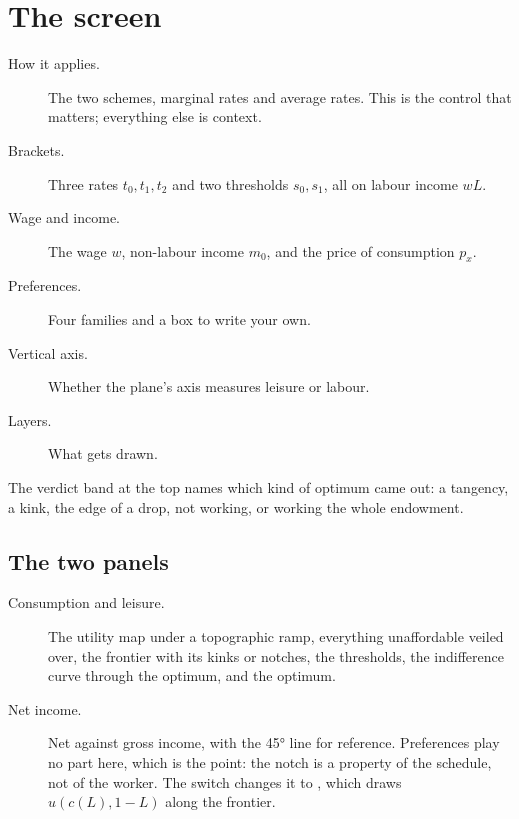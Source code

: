 \documentclass[11pt,a4paper]{appletmanual}
\begin{document}


\section{The screen}


\begin{description}
\item[How it applies.] The two schemes, marginal rates and average rates. This
  is the control that matters; everything else is context.
\item[Brackets.] Three rates $t_0, t_1, t_2$ and two thresholds $s_0, s_1$, all
  on labour income $wL$.
\item[Wage and income.] The wage $w$, non-labour income $m_0$, and the price of
  consumption $p_x$.
\item[Preferences.] Four families and a box to write your own.
\item[Vertical axis.] Whether the plane's axis measures leisure or labour.
\item[Layers.] What gets drawn.
\end{description}

The verdict band at the top names which kind of optimum came out: a tangency, a
kink, the edge of a drop, not working, or working the whole endowment.

\subsection{The two panels}

\begin{description}
\item[Consumption and leisure.] The utility map under a topographic ramp,
  everything unaffordable veiled over, the frontier with its kinks or notches,
  the thresholds, the indifference curve through the optimum, and the optimum.
\item[Net income.] Net against gross income, with the 45° line for reference.
  Preferences play no part here, which is the point: the notch is a property of
  the schedule, not of the worker. The switch changes it to , which
  draws $u(c(L), 1-L)$ along the frontier.
\end{description}
\end{document}
